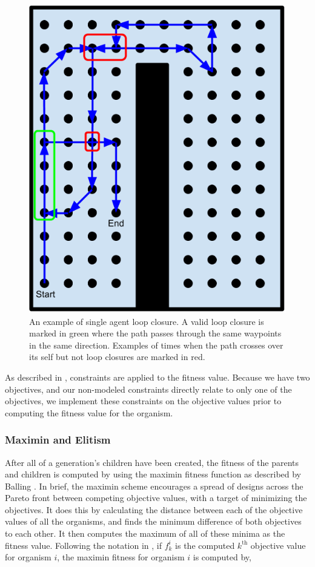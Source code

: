 \documentclass[letterpaper, 10 pt, conference]{ieeeconf}  %
\begin{document}
\begin{figure}
\centering
\includegraphics[width=0.8\linewidth]{figures/loop_closure.png}
\caption{An example of single agent loop closure. A valid loop closure is marked in green where the path passes through the same waypoints in the same direction. Examples of times when the path crosses over its self but not loop closures are marked in red.}
\label{fig:loop_closure}
\end{figure}

As described in \cite{Parkinson2019}, constraints are applied to the fitness value. Because we have two objectives, and our non-modeled constraints directly relate to only one of the objectives, we implement these constraints on the objective values prior to computing the fitness value for the organism.

\subsubsection{Maximin and Elitism}

After all of a generation's children have been created, the fitness of the parents and children is computed by using the maximin fitness function as described by Balling \cite{Balling2003}. In brief, the maximin scheme encourages a spread of designs across the Pareto front between competing objective values, with a target of minimizing the objectives. It does this by calculating the distance between each of the objective values of all the organisms, and finds the minimum difference of both objectives to each other. It then computes the maximum of all of these minima as the fitness value. Following the notation in \cite{Parkinson2019}, if $f_k^i$ is the computed $k^{\mathrm{th}}$ objective value for organism $i$, the maximin fitness for organism $i$ is computed by,
\end{document}
